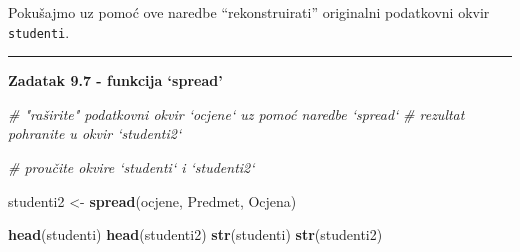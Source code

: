 \documentclass[]{book}
\newenvironment{Shaded}{\begin{snugshade}}{\end{snugshade}}
\newcommand{\KeywordTok}[1]{\textcolor[rgb]{0.13,0.29,0.53}{\textbf{#1}}}
\newcommand{\StringTok}[1]{\textcolor[rgb]{0.31,0.60,0.02}{#1}}
\newcommand{\CommentTok}[1]{\textcolor[rgb]{0.56,0.35,0.01}{\textit{#1}}}
\newcommand{\NormalTok}[1]{#1}
\theoremstyle{definition}
\theoremstyle{definition}
\theoremstyle{definition}
\theoremstyle{remark}
\begin{document}
Pokušajmo uz pomoć ove naredbe ``rekonstruirati'' originalni podatkovni
okvir \texttt{studenti}.

\begin{center}\rule{0.5\linewidth}{\linethickness}\end{center}

\textbf{Zadatak 9.7 - funkcija `spread'}

\begin{Shaded}
\begin{Highlighting}[]
\CommentTok{# "raširite" podatkovni okvir `ocjene` uz pomoć naredbe `spread`}
\CommentTok{# rezultat pohranite u okvir `studenti2`}

\CommentTok{# proučite okvire `studenti` i `studenti2`}
\end{Highlighting}
\end{Shaded}

\begin{Shaded}
\begin{Highlighting}[]
\NormalTok{studenti2 <-}\StringTok{ }\KeywordTok{spread}\NormalTok{(ocjene, Predmet, Ocjena)}

\KeywordTok{head}\NormalTok{(studenti)}
\KeywordTok{head}\NormalTok{(studenti2)}
\KeywordTok{str}\NormalTok{(studenti)}
\KeywordTok{str}\NormalTok{(studenti2)}
\end{Highlighting}
\end{Shaded}
\end{document}
